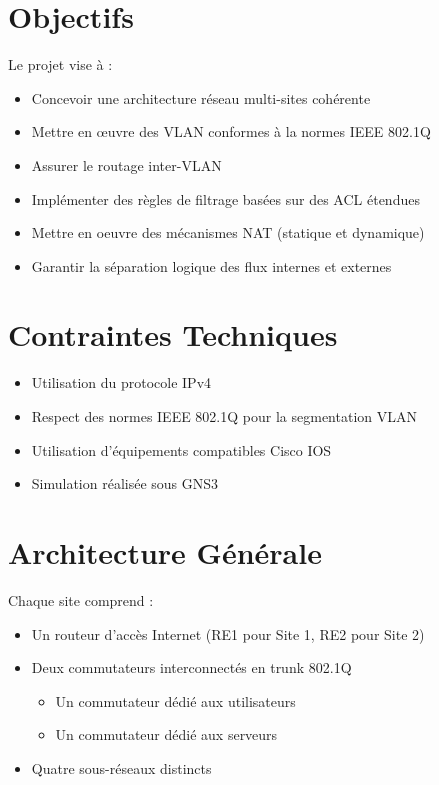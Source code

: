 \documentclass[11pt,a4paper]{article}
\begin{document}
	\section{Objectifs}
	Le projet vise à :
	\begin{itemize}
		\item[$\rightarrow$] Concevoir une architecture réseau multi-sites cohérente
		\item[$\rightarrow$] Mettre en œuvre des VLAN conformes à la normes IEEE 802.1Q
		\item[$\rightarrow$] Assurer le routage inter-VLAN
		\item[$\rightarrow$] Implémenter des règles de filtrage basées sur des ACL étendues
		\item[$\rightarrow$] Mettre en oeuvre des mécanismes NAT (statique et dynamique)
		\item[$\rightarrow$] Garantir la séparation logique des flux internes et externes
	\end{itemize}
	\section{Contraintes Techniques}

		\begin{itemize}
			\item Utilisation du protocole IPv4
			\item Respect des normes IEEE 802.1Q pour la segmentation VLAN
			\item Utilisation d’équipements compatibles Cisco IOS
			\item Simulation réalisée sous GNS3
		\end{itemize}

	\section{Architecture Générale}
	
	Chaque site comprend :
	
	\begin{itemize}[label=$\bullet$]
		\item Un routeur d’accès Internet (RE1 pour Site 1, RE2 pour Site 2)
		\item Deux commutateurs interconnectés en trunk 802.1Q
		\begin{itemize}
			\item Un commutateur dédié aux utilisateurs
			\item Un commutateur dédié aux serveurs
		\end{itemize}
		\item Quatre sous-réseaux distincts
	\end{itemize}
	
\end{document}
